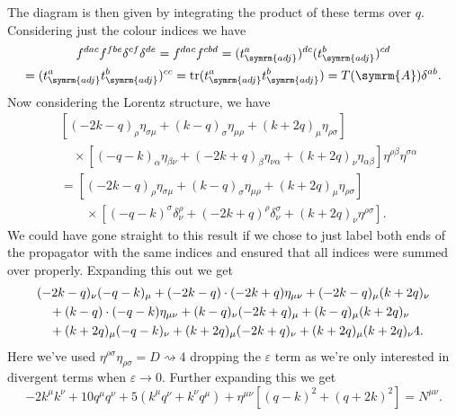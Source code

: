 \documentclass[fleqn]{NotesClass}
\newcommand{\minkowskiMetric}{\eta}
\DeclareMathOperator{\tr}{tr}
\newcommand{\adj}{\symrm{adj}}
\newcommand{\adjointRep}{\symrm{A}}
\begin{document}
    The diagram is then given by integrating the product of these terms over \(q\).
    Considering just the colour indices we have
    \begin{multline}
        f^{dac}f^{fbe}\delta^{cf}\delta^{de} = f^{dac}f^{cbd} = (t_{\adj}^a)^{dc}(t_{\adj}^{b})^{cd}\\
        = (t_{\adj}^a t_{\adj}^b)^{cc} = \tr(t_{\adj}^at_{\adj}^b) = T(\adjointRep)\delta^{ab}.
    \end{multline}
    Now considering the Lorentz structure, we have
    \begin{align}
        &[(-2k - q)_\rho\minkowskiMetric_{\sigma\mu} + (k - q)_\sigma\minkowskiMetric_{\mu\rho} + (k + 2q)_\mu\minkowskiMetric_{\rho\sigma}]\\
        &\quad\times
        [(-q - k)_\alpha\minkowskiMetric_{\beta\nu} + (-2k + q)_\beta\minkowskiMetric_{\nu\alpha} + (k + 2q)_\nu\minkowskiMetric_{\alpha\beta}]
        \minkowskiMetric^{\rho\beta} \minkowskiMetric^{\sigma\alpha}\\
        &= [(-2k - q)_\rho\minkowskiMetric_{\sigma\mu} + (k - q)_\sigma\minkowskiMetric_{\mu\rho} + (k + 2q)_\mu\minkowskiMetric_{\rho\sigma}]\\
        &\qquad\times [(-q - k)^\sigma \delta^\rho_\nu + (-2k + q)^\rho \delta^\sigma_\nu + (k + 2q)_\nu \minkowskiMetric^{\rho\sigma}].
    \end{align}
    We could have gone straight to this result if we chose to just label both ends of the propagator with the same indices and ensured that all indices were summed over properly.
    Expanding this out we get
    \begin{align}
        &(-2k - q)_\nu(-q - k)_\mu + (-2k - q) \cdot (-2k + q)\minkowskiMetric_{\mu\nu} + (-2k - q)_\mu (k + 2q)_\nu \notag\\
        &\quad + (k - q) \cdot (-q - k) \minkowskiMetric_{\mu\nu} + (k - q)_\nu (-2k + q)_\mu + (k - q)_\mu (k + 2q)_\nu \notag\\
        &\quad + (k + 2q)_\mu (-q - k)_\nu + (k + 2q)_\mu (-2k + q)_\nu + (k + 2q)_\mu (k + 2q)_\nu 4.
    \end{align}
    Here we've used \(\minkowskiMetric^{\rho\sigma}\minkowskiMetric_{\rho\sigma} = D \rightsquigarrow 4\) dropping the \(\varepsilon\) term as we're only interested in divergent terms when \(\varepsilon \to 0\).
    Further expanding this we get
    \begin{equation}
        -2k^\mu k^\nu + 10q^\mu q^\nu + 5(k^\mu q^\nu + k^\nu q^\mu) + \minkowskiMetric^{\mu\nu}[(q - k)^2 + (q + 2k)^2] = N^{\mu\nu}.
    \end{equation}
    
\end{document}
